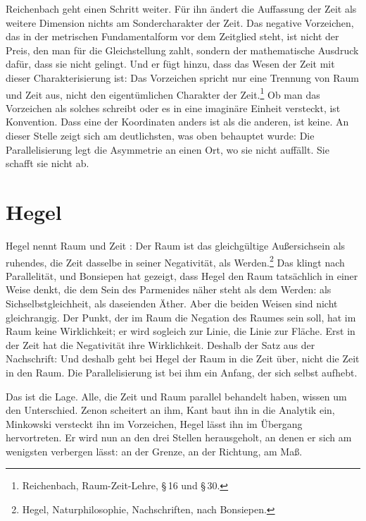 Reichenbach geht einen Schritt weiter. Für ihn ändert die Auffassung der Zeit als weitere Dimension nichts am Sondercharakter der Zeit. Das negative Vorzeichen, das in der metrischen Fundamentalform vor dem Zeitglied steht, ist nicht der Preis, den man für die Gleichstellung zahlt, sondern der mathematische Ausdruck dafür, dass sie nicht gelingt. Und er fügt hinzu, dass das Wesen der Zeit mit dieser Charakterisierung  ist: Das Vorzeichen spricht nur eine Trennung von Raum und Zeit aus, nicht den eigentümlichen Charakter der Zeit.\footnote{Reichenbach, Raum-Zeit-Lehre, \S\,16 und \S\,30.} Ob man das Vorzeichen als solches schreibt oder es in eine imaginäre Einheit versteckt, ist Konvention. Dass eine der Koordinaten anders ist als die anderen, ist keine. An dieser Stelle zeigt sich am deutlichsten, was oben behauptet wurde: Die Parallelisierung legt die Asymmetrie an einen Ort, wo sie nicht auffällt. Sie schafft sie nicht ab.

\section{Hegel}

Hegel nennt Raum und Zeit : Der Raum ist das gleichgültige Außersichsein als ruhendes, die Zeit dasselbe in seiner Negativität, als Werden.\footnote{Hegel, Naturphilosophie, Nachschriften, nach Bonsiepen.} Das klingt nach Parallelität, und Bonsiepen hat gezeigt, dass Hegel den Raum tatsächlich in einer Weise denkt, die dem Sein des Parmenides näher steht als dem Werden: als Sichselbstgleichheit, als daseienden Äther. Aber die beiden Weisen sind nicht gleichrangig. Der Punkt, der im Raum die Negation des Raumes sein soll, hat im Raum keine Wirklichkeit; er wird sogleich zur Linie, die Linie zur Fläche. Erst in der Zeit hat die Negativität ihre Wirklichkeit. Deshalb der Satz aus der Nachschrift:  Und deshalb geht bei Hegel der Raum in die Zeit über, nicht die Zeit in den Raum. Die Parallelisierung ist bei ihm ein Anfang, der sich selbst aufhebt.

Das ist die Lage. Alle, die Zeit und Raum parallel behandelt haben, wissen um den Unterschied. Zenon scheitert an ihm, Kant baut ihn in die Analytik ein, Minkowski versteckt ihn im Vorzeichen, Hegel lässt ihn im Übergang hervortreten. Er wird nun an den drei Stellen herausgeholt, an denen er sich am wenigsten verbergen lässt: an der Grenze, an der Richtung, am Maß.
